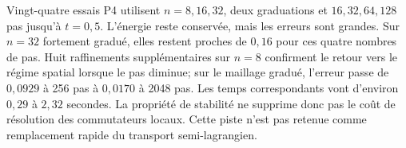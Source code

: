 \documentclass[11pt,a4paper]{article}
\begin{document}
Vingt-quatre essais P4 utilisent $n=8,16,32$, deux graduations et
$16,32,64,128$ pas jusqu'à $t=0,5$. L'énergie reste conservée, mais les
erreurs sont grandes. Sur $n=32$ fortement gradué, elles restent proches de
$0,16$ pour ces quatre nombres de pas. Huit raffinements supplémentaires sur
$n=8$ confirment le retour vers le régime spatial lorsque le pas diminue;
sur le maillage gradué, l'erreur passe de $0,0929$ à 256 pas à $0,0170$ à
2048 pas. Les temps correspondants vont d'environ $0,29$ à $2,32$ secondes.
La propriété de stabilité ne supprime donc pas le coût de résolution des
commutateurs locaux. Cette piste n'est pas retenue comme remplacement rapide
du transport semi-lagrangien.
\end{document}
